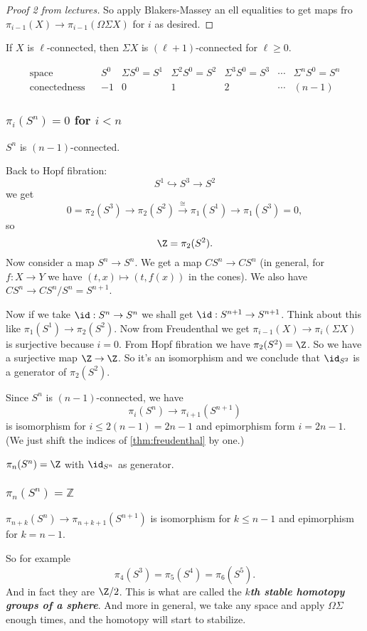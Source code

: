\begin{remark}
\begin{proof}[Proof 2 from lectures]
	So apply Blakers-Massey an ell equalities to get maps fro $\pi_{i-1}(X)\to\pi_{i-1}(\Omega\Sigma X)$ for $i$ as desired.
\end{proof}
\begin{coro}
	If $X$ is $\ell$-connected, then $\Sigma X$ is $(\ell+1)$-connected for $\ell\geq0$.
\end{coro}
\[\begin{matrix}
	\text{space}&&S^0&\Sigma S^0=S^1&\Sigma^2S^0=S^2&\Sigma^3S^0=S^3&\cdots&\Sigma^nS^0=S^n\\
	\text{conectedness}&&-1&0&1&2&\cdots&(n-1)
\end{matrix}\]

\subsubsection{\texorpdfstring{$\pi_{i}(S^{n})=0$}{πᵢ(Sⁿ)} for \texorpdfstring{$i<n$}{i<n}}

\begin{coro}
	$S^n$ is $(n-1)$-connected.
\end{coro}
Back to Hopf fibration:
\[S^1\hookrightarrow S^3\to S^2\]
we get
\[0=\pi_2(S^3)\to\pi_2(S^2)\overset{\cong}{\to}\pi_1(S^1)\to\pi_1(S^3)=0,\]
so
\[\Z=\pi_2(S^2).\]
Now consider a map $S^n\to S^n$. We get a map $CS^n\to CS^n$ (in general, for $f:X\to Y$ we have $(t,x)\mapsto(t,f(x))$ in the cones). We also have $CS^n\to CS^n/S^n=S^{n+1}$.

Now if we take $\id:S^n\to S^n$ we shall get $\id:S^{n+1}\to S^{n+1}$. Think about this like $\pi_1(S^1)\to\pi_2(S^2)$. Now from Freudenthal we get $\pi_{i-1}(X)\to\pi_i(\Sigma X)$ is surjective because $i=0$. From Hopf fibration we have $\pi_2(S^2)=\Z$. So we have a surjective map $\Z\to\Z$. So it's an isomorphism and we conclude that $\id_{S^2}$ is a generator of $\pi_2(S^2)$.
\begin{coro}
	Since $S^n$ is $(n-1)$-connected, we have
	\[\pi_i(S^n)\to\pi_{i+1}(S^{n+1})\]
	is isomorphism for $i\leq 2(n-1)=2n-1$ and epimorphism form $i=2n-1$. (We just shift the indices of \cref{thm:freudenthal} by one.)
\end{coro}
\begin{coro}
	$\pi_n(S^n)=\Z$ with $\id_{S^n}$ as generator.
\end{coro}

\subsubsection{$\pi_{n}(S^{n})=\mathbb{Z}$}
\begin{coro}
	$\pi_{n+k}(S^n)\to\pi_{n+k+1}(S^{n+1})$ is isomorphism for $k\leq n-1$ and epimorphism for $k=n-1$.
\end{coro}
So for example
\[\pi_4(S^3)=\pi_5(S^4)=\pi_6(S^5).\]
And in fact they are $\Z/2$. This is what are called the \textbf{\textit{$k$th stable homotopy groups of a sphere}}. And more in general, we take any space and apply $\Omega\Sigma$ enough times, and the homotopy will start to stabilize.


\end{remark}
